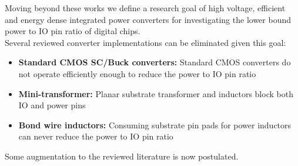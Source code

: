 \documentclass[letterpaper,twocolumn,10pt]{article}
\begin{document}
Moving beyond these works we define a research goal of high voltage, efficient and energy dense integrated power converters for investigating the lower bound power to IO pin ratio of digital chips.\\
Several reviewed converter implementations can be eliminated given this goal:
\begin{itemize}
\item{\textbf{Standard CMOS SC/Buck converters: }Standard CMOS converters do not operate efficiently enough to reduce the power to IO pin ratio}
\item{\textbf{Mini-transformer: }Planar substrate transformer and inductors block both IO and power pins }
\item{\textbf{Bond wire inductors: }Consuming substrate pin pads for power inductors can never reduce the power to IO pin ratio}
\end{itemize}   
Some augmentation to the reviewed literature is now postulated.\\
\end{document}

